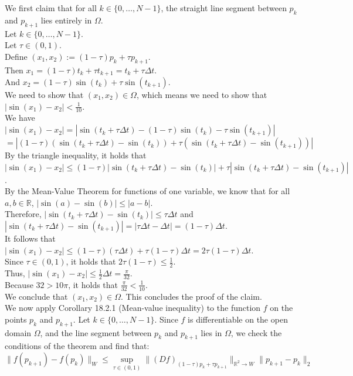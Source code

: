 \documentclass[11pt,a4paper]{article}
\theoremstyle{definition}
\theoremstyle{plain}
\theoremstyle{remark}
\begin{document}
\noindent We first claim that for all $k \in \{0, \dots, N-1\}$, the straight line segment between $p_k$ and $p_{k+1}$ lies entirely in $\Omega$. \\
Let $k \in \{0, \dots, N-1\}$.\\
Let $\tau \in (0,1)$.\\
Define $(x_1, x_2) := (1-\tau)p_k + \tau p_{k+1}$.\\
Then $x_1 = (1-\tau)t_k + \tau t_{k+1} = t_k + \tau \Delta t$.\\
And $x_2 = (1-\tau)\sin(t_k) + \tau \sin(t_{k+1})$.\\
We need to show that $(x_1, x_2) \in \Omega$, which means we need to show that $|\sin(x_1) - x_2| < \frac{1}{10}$.\\
We have
$|\sin(x_1) - x_2| = |\sin(t_k + \tau \Delta t) - (1-\tau)\sin(t_k) - \tau \sin(t_{k+1})|$
$= |(1-\tau)(\sin(t_k + \tau \Delta t) - \sin(t_k)) + \tau(\sin(t_k + \tau \Delta t) - \sin(t_{k+1}))|$\\
By the triangle inequality, it holds that
$|\sin(x_1) - x_2| \le (1-\tau)|\sin(t_k + \tau \Delta t) - \sin(t_k)| + \tau|\sin(t_k + \tau \Delta t) - \sin(t_{k+1})|$.\\
By the Mean-Value Theorem for functions of one variable, we know that for all $a,b \in \mathbb{R}$, $|\sin(a) - \sin(b)| \le |a - b|$.\\
Therefore, $|\sin(t_k + \tau \Delta t) - \sin(t_k)| \le \tau \Delta t$ and $|\sin(t_k + \tau \Delta t) - \sin(t_{k+1})| = |\tau \Delta t - \Delta t| = (1-\tau)\Delta t$. \\
It follows that $|\sin(x_1) - x_2| \le (1-\tau)(\tau \Delta t) + \tau(1-\tau)\Delta t = 2\tau(1-\tau)\Delta t$.\\
Since $\tau \in (0,1)$, it holds that $2\tau(1-\tau) \le \frac{1}{2}$.\\
Thus, $|\sin(x_1) - x_2| \le \frac{1}{2}\Delta t = \frac{\pi}{32}$. \\
Because $32 > 10\pi$, it holds that $\frac{\pi}{32} < \frac{1}{10}$. \\
We conclude that $(x_1, x_2) \in \Omega$. This concludes the proof of the claim.\\

\noindent We now apply Corollary 18.2.1 (Mean-value inequality) to the function $f$ on the points $p_k$ and $p_{k+1}$. Let $k \in \{0, \dots, N-1\}$. Since $f$ is differentiable on the open domain $\Omega$, and the line segment between $p_k$ and $p_{k+1}$ lies in $\Omega$, we check the conditions of the theorem and find that:\\
$$\|f(p_{k+1}) - f(p_k)\|_W \le \sup_{\tau \in (0,1)} \|(Df)_{(1-\tau)p_k + \tau p_{k+1}}\|_{\mathbb{R}^2 \to W} \|p_{k+1} - p_k\|_2$$
\end{document}
